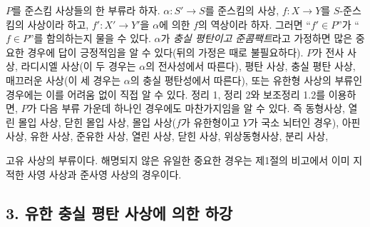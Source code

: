 \documentclass[11pt,twoside,openany]{book}
\numberwithin{equation}{section}
\newcommand{\sourceunit}{front}
\newcommand{\src}[1]{%
  \phantomsection\hypertarget{src:\sourceunit:#1}{}%
  \marginpar{\raggedleft\footnotesize\sffamily #1}%
}
\theoremstyle{plain}
\theoremstyle{definition}
\theoremstyle{remark}
\begin{document}
$P$를 준스킴 사상들의 한 부류라 하자.
$\alpha:S'\longrightarrow S$를 준스킴의 사상,
$f:X\longrightarrow Y$를 $S$-준스킴의 사상이라 하고,
$f':X'\longrightarrow Y'$을 $\alpha$에 의한 $f$의 역상이라 하자.
그러면 “$f'\in P$”가 “$f\in P$”를 함의하는지 물을 수 있다.
$\alpha$가 \emph{충실 평탄이고 준콤팩트}라고 가정하면 많은 중요한
경우에 답이 긍정적임을 알 수 있다(뒤의 가정은 때로 불필요하다).
$P$가 전사 사상, 라디시엘 사상(이 두 경우는 $\alpha$의 전사성에서
따른다), 평탄 사상, 충실 평탄 사상, 매끄러운 사상(이 세 경우는
$\alpha$의 충실 평탄성에서 따른다), 또는 유한형 사상의 부류인
경우에는 이를 어려움 없이 직접 알 수 있다. 정리 1, 정리 2와
보조정리 1.2를 이용하면, $P$가 다음 부류 가운데 하나인 경우에도
마찬가지임을 알 수 있다. 즉 동형사상, 열린 몰입 사상, 닫힌 몰입
사상, 몰입 사상($f$가 유한형이고 $Y$가 국소 뇌터인 경우), 아핀
사상, 유한 사상, 준유한 사상, 열린 사상, 닫힌 사상, 위상동형사상,
분리 사상,

\src{319}
고유 사상의 부류이다. 해명되지 않은 유일한 중요한 경우는
제1절의 비고에서 이미 지적한 사영 사상과 준사영 사상의 경우이다.

\subsection*{3. 유한 충실 평탄 사상에 의한 하강}
\end{document}
